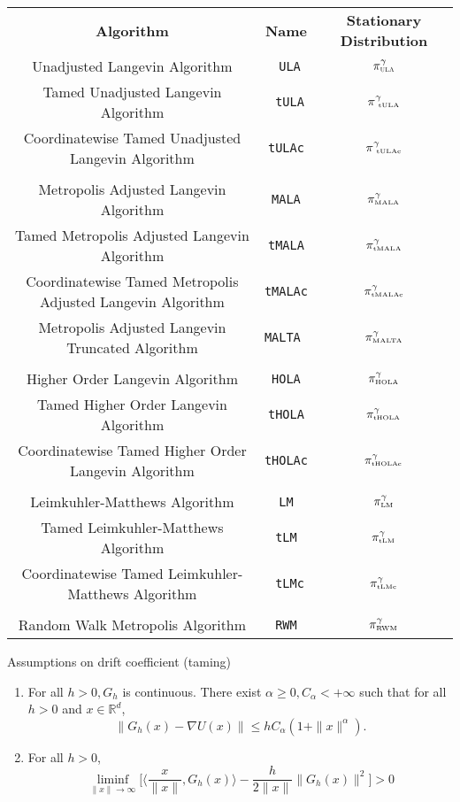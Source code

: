 \documentclass[a4paper]{article}
\theoremstyle{definition}
\newcommand{\R}{\mathbb{R}}
\begin{document}
\bgroup
\def\arraystretch{1.25}
\begin{center}
\begin{tabular}{ccc}
	\textbf{Algorithm} & \textbf{Name} & \textbf{Stationary Distribution} \\ 
	Unadjusted Langevin Algorithm &\texttt{ ULA} & \(\pi^{\gamma}_{\text{\tiny  \sc ULA}}\)\\ 
	Tamed Unadjusted Langevin Algorithm &\texttt{ tULA} & \(\pi^{\gamma}_{\text{ \tiny   tULA}}\) \\ 
	Coordinatewise Tamed Unadjusted Langevin Algorithm & \texttt{\tiny tULAc} & \(\pi^{\gamma}_{\text{ \tiny tULAc}}\) \\ 
	&  \\ 
	Metropolis Adjusted Langevin Algorithm & \texttt{MALA} & \(\pi^{\gamma}_{\text{\tiny MALA}}\) \\ 
	Tamed Metropolis Adjusted Langevin Algorithm & \texttt{tMALA} & \(\pi^{\gamma}_{\text{\tiny tMALA}}\) \\ 
	Coordinatewise Tamed Metropolis Adjusted Langevin Algorithm & \texttt{\tiny tMALAc} & \(\pi^{\gamma}_{\text{\tiny tMALAc}}\) \\ 
	Metropolis Adjusted Langevin Truncated  Algorithm & \texttt{MALTA } & \(\pi^{\gamma}_{\text{\tiny MALTA}}\)\\ 
	&  \\ 
	Higher Order Langevin Algorithm & \texttt{HOLA} & \(\pi^{\gamma}_{\text{\tiny HOLA}}\) \\ 
	Tamed Higher Order Langevin Algorithm & \texttt{tHOLA}  & \(\pi^{\gamma}_{\text{\tiny tHOLA}}\)\\ 
	Coordinatewise Tamed Higher Order Langevin Algorithm & \texttt{tHOLAc}&  \(\pi^{\gamma}_{\text{\tiny tHOLAc}}\) \\ 
	&  \\ 
	Leimkuhler-Matthews Algorithm & \texttt{LM} & \(\pi^{\gamma}_{\text{\tiny LM}}\) \\ 
	Tamed Leimkuhler-Matthews Algorithm & \texttt{tLM} & \(\pi^{\gamma}_{\text{\tiny tLM}}\)\\ 
	Coordinatewise Tamed Leimkuhler-Matthews Algorithm & \texttt{ tLMc} & \(\pi^{\gamma}_{\text{\tiny tLMc}}\) \\ 
	&  \\ 
	Random Walk Metropolis Algorithm & \texttt{RWM} & \(\pi^{\gamma}_{\text{\tiny RWM}}\) \\ 
\end{tabular} 
\end{center}


Assumptions on drift coefficient (taming)
\begin{enumerate}[label={\bf A{\arabic*}}]
	\item  For all \(h>0, G_h\) is continuous. There exist \(\alpha\geq 0, C_{\alpha}<+\infty\) such that for all \(h >0 \) and \(x \in \R^d\),
	\[\|G_h(x)-\nabla U(x)\| \leq hC_{\alpha}(1+\|x\|^{\alpha}).\]
	\item For all \(h>0\),
	\[ \liminf_{\|x\|\to \infty} \bigg\lbrack \bigg\langle \frac{x}{\|x\|}, G_h(x)\bigg\rangle - \frac{h}{2\|x\|}\|G_h(x)\|^2\bigg\rbrack >0\]
\end{enumerate}
\end{document}
